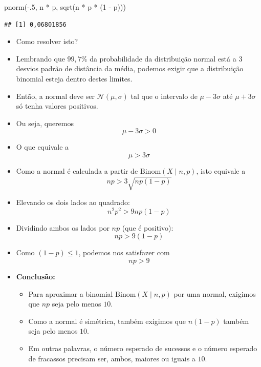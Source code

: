 \documentclass[
  11pt]{report}
\newenvironment{Shaded}{\begin{snugshade}}{\end{snugshade}}
\newcommand{\DecValTok}[1]{\textcolor[rgb]{0.00,0.00,0.81}{#1}}
\newcommand{\FunctionTok}[1]{\textcolor[rgb]{0.00,0.00,0.00}{#1}}
\newcommand{\NormalTok}[1]{#1}
\newcommand{\SpecialCharTok}[1]{\textcolor[rgb]{0.00,0.00,0.00}{#1}}
\renewenvironment{Shaded}{
    \begin{mdframed}[%
      roundcorner=2pt,%
      innerleftmargin=5pt,%
      innerrightmargin=5pt,%
      topline=true,%
      leftline=true,%
      rightline=true,%
      bottomline=true,%
      linewidth=0.5pt,%
      linecolor=black!20,%
      backgroundcolor=black!2,%
      skipabove=2ex,%
      skipbelow=2.5ex%
    ]%
  }
  {
    \end{mdframed}
  }
\begin{document}
\begin{Shaded}
\begin{Highlighting}[]
\FunctionTok{pnorm}\NormalTok{(}\SpecialCharTok{{-}}\NormalTok{.}\DecValTok{5}\NormalTok{, n }\SpecialCharTok{*}\NormalTok{ p, }\FunctionTok{sqrt}\NormalTok{(n }\SpecialCharTok{*}\NormalTok{ p }\SpecialCharTok{*}\NormalTok{ (}\DecValTok{1} \SpecialCharTok{{-}}\NormalTok{ p)))}
\end{Highlighting}
\end{Shaded}

\begin{verbatim}
## [1] 0,06801856
\end{verbatim}

\begin{itemize}
\item
  Como resolver isto?
\item
  Lembrando que $99{,}7\%$ da probabilidade da distribuição normal está a $3$ desvios padrão de distância da média, podemos exigir que a distribuição binomial esteja dentro destes limites.
\item
  Então, a normal deve ser $\mathcal{N}(\mu, \sigma)$ tal que o intervalo de $\mu - 3\sigma$ até $\mu + 3\sigma$ só tenha valores positivos.
\item
  Ou seja, queremos \[\mu - 3\sigma > 0\]
\item
  O que equivale a \[\mu > 3\sigma\]
\item
  Como a normal é calculada a partir de $\text{Binom}(X \mid n, p)$, isto equivale a
  \[
  np > 3 \sqrt{np(1-p)}
  \]
\item
  Elevando os dois lados ao quadrado: \[n^2p^2 > 9np(1-p)\]
\item
  Dividindo ambos os lados por $np$ (que é positivo): \[np > 9(1-p)\]
\item
  Como $(1-p) \leq 1$, podemos nos satisfazer com \[np > 9\]
\item
  \textbf{Conclusão:}

  \begin{itemize}
  \item
    Para aproximar a binomial $\text{Binom}(X \mid n, p)$ por uma normal, exigimos que $np$ seja pelo menos $10$.
  \item
    Como a normal é simétrica, também exigimos que $n(1-p)$ também seja pelo menos $10$.
  \item
    Em outras palavras, o número esperado de sucessos e o número esperado de fracassos precisam ser, ambos, maiores ou iguais a $10$.
  \end{itemize}
\end{itemize}
\end{document}
